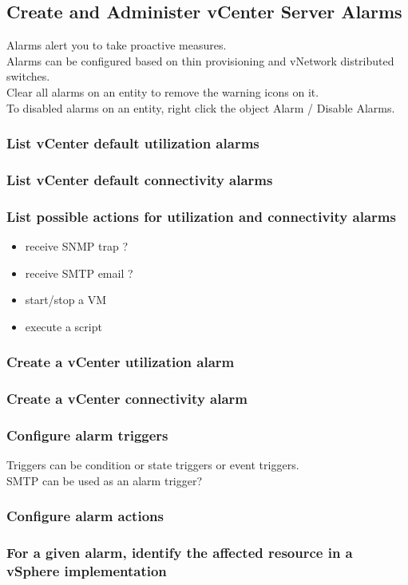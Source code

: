 \subsection{Create and Administer vCenter Server Alarms}

Alarms alert you to take proactive measures.\\

Alarms can be configured based on thin provisioning and vNetwork distributed
switches.\\

Clear all alarms on an entity to remove the warning icons on it.\\

To disabled alarms on an entity, right click the object Alarm / Disable
Alarms.

\subsubsection{List vCenter default utilization alarms}

\subsubsection{List vCenter default connectivity alarms}

\subsubsection{List possible actions for utilization and connectivity alarms}

\begin{itemize}
\item receive SNMP trap ?
\item receive SMTP email ?
\item start/stop a VM
\item execute a script
\end{itemize}

\subsubsection{Create a vCenter utilization alarm}

\subsubsection{Create a vCenter connectivity alarm}

\subsubsection{Configure alarm triggers}

Triggers can be condition or state triggers or event triggers.\\

SMTP can be used as an alarm trigger?

\subsubsection{Configure alarm actions}

\subsubsection{For a given alarm, identify the affected resource in a vSphere implementation}
